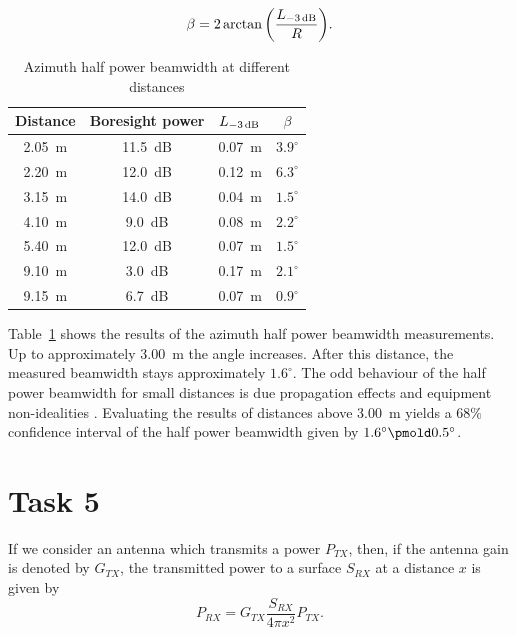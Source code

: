 \documentclass[11pt,titlepage]{report}
\begin{document}
\begin{equation}
	\beta = 2 \arctan{\left(\frac{L_{\text{\SI{-3}{dB}}}}{R}\right)}.
\end{equation}

\newcommand{\ignore}[1]{}

\begin{table}[H]
	\centering
	\caption{Azimuth half power beamwidth at different distances}
	\label{tab:ass-2-az}
	\begin{tabular}{c c c c}
		\hline\hline
		Distance & Boresight power & $L_{\text{\SI{-3}{dB}}}$ & $\beta$ \\
		\hline
		\SI{2.05}{m} & \SI{11.5}{dB} & \SI{0.07}{m} & $3.9^\circ$ \\
		\SI{2.20}{m} & \SI{12.0}{dB} & \SI{0.12}{m} & $6.3^\circ$ \\
		\SI{3.15}{m} & \SI{14.0}{dB} & \SI{0.04}{m} & $1.5^\circ$ \\
		\SI{4.10}{m} & \SI{9.0}{dB} & \SI{0.08}{m} & $2.2^\circ$ \\
		\SI{5.40}{m} & \SI{12.0}{dB} & \SI{0.07}{m} & $1.5^\circ$ \\
		\SI{9.10}{m} & \SI{3.0}{dB} & \SI{0.17}{m} & $2.1^\circ$ \\
		\SI{9.15}{m} & \SI{6.7}{dB} & \SI{0.07}{m} & $0.9^\circ$ \\
		\hline
	\end{tabular}
\end{table}

\let\pm\pmold
\newcommand{\pm}{\mathbin{\tikz [x=1.4ex,y=1.4ex,line width=.1ex] \draw (0.0,0) -- (1.0,0) (0.5,0.08) -- (0.5,0.92) (0.0,0.5) -- (1.0,0.5);}}

Table~\ref{tab:ass-2-az} shows the results of the azimuth half power beamwidth measurements. Up to approximately \SI{3.00}{m} the angle increases. After this distance, the measured beamwidth stays approximately $1.6^\circ$. The odd behaviour of the half power beamwidth for small distances is due propagation effects and equipment non-idealities \cite{epo4-manual}. Evaluating the results of distances above \SI{3.00}{m} yields a $68\%$ confidence interval of the half power beamwidth given by $1.6^{\circ} \pm 0.5^{\circ}$.

\section{Task 5}
If we consider an antenna which transmits a power $P_{TX}$, then, if the antenna gain is denoted by $G_{TX}$, the transmitted power to a surface $S_{RX}$ at a distance $x$ is given by	
\begin{equation}
 	P_{RX} = G_{TX} \frac{S_{RX}}{4 \pi x^2}P_{TX}.
\end{equation}
\end{document}
